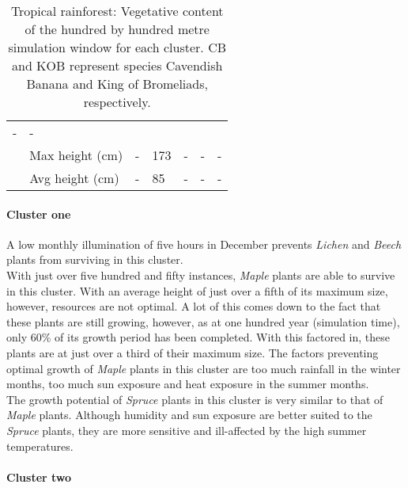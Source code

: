 \begin{table}[]
\begin{tabular}{|p{2cm}|p{2cm}|p{1.5cm}|p{1.5cm}|p{1.5cm}|p{1.5cm}|p{1.5cm}|}
						\multicolumn{1}{l|}{-} & 
						\multicolumn{1}{l|}{-} \\\cline{2-7} &
						\multicolumn{1}{l|}{Max height (cm)} & 
						\multicolumn{1}{l|}{-} &
						\multicolumn{1}{l|}{173} & 
						\multicolumn{1}{l|}{-} &
						\multicolumn{1}{l|}{-} & 
						\multicolumn{1}{l|}{-} \\\cline{2-7} &
						\multicolumn{1}{l|}{Avg height (cm)} & 
						\multicolumn{1}{l|}{-} &
						\multicolumn{1}{l|}{85} & 
						\multicolumn{1}{l|}{-} &
						\multicolumn{1}{l|}{-} & 
						\multicolumn{1}{l|}{-} \\\cline{2-7}
		\hline                                                       
		\end{tabular}
	\label{tab:results_alpine_species_cluster_properties}	
	\caption{Tropical rainforest: Vegetative content of the hundred by hundred metre simulation window for each cluster. CB and KOB represent species Cavendish Banana and King of Bromeliads, respectively.}
\end{table}

\paragraph{Cluster one}

A low monthly illumination of five hours in December prevents \textit{Lichen} and \textit{Beech} plants from surviving in this cluster.\\
With just over five hundred and fifty instances, \textit{Maple} plants are able to survive in this cluster. With an average height of just over a fifth of its maximum size, however, resources are not optimal. A lot of this comes down to the fact that these plants are still growing, however, as at one hundred year (simulation time), only 60\% of its growth period has been completed. With this factored in, these plants are at just over a third of their maximum size. The factors preventing optimal growth of \textit{Maple} plants in this cluster are too much rainfall in the winter months, too much sun exposure and heat exposure in the summer months.\\
The growth potential of \textit{Spruce} plants in this cluster is very similar to that of \textit{Maple} plants. Although humidity and sun exposure are better suited to the \textit{Spruce} plants, they are more sensitive and ill-affected by the high summer temperatures.

\paragraph{Cluster two}

